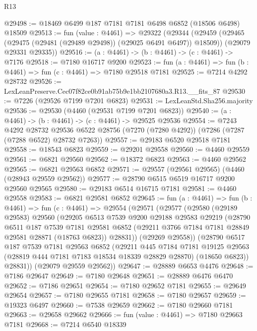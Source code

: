 \begin{lexlean}{R13}
\begin{coremodule}
@29498 := @18469 @6499 @187 @7181 @7181 @6498 @6852 (@18506 @6498) @18509
@29513 := fun (value : @4461) =>
  @29322
    (@29344
      (@29459 (@29465 (@29475 (@29481 (@29489 @29498)) (@29025 @6491 @6497)) @18509))
      (@29079 @29331 @29335))
@29516 := (a : @4461) -> (b : @4461) -> (c : @4461) -> @7176
@29518 := @7180 @16717 @9200
@29523 := fun (a : @4461) => fun (b : @4461) => fun (c : @4461) => @7180 @29518 @7181
@29525 := @7214 @4292 @28732
@29526 := LexLeanPreserve.Cec07f82ce0b91ab75b9e1bb2107680a3.R13.__fits_87
@29530 := @7226 (@29526 @7199 @7201 @6823)
@29531 := LexLeanStd.Sha256.majority
@29536 := @29530 (@4460 (@29531 @7199 @7201 @6823))
@29540 := (a : @4461) -> (b : @4461) -> (c : @4461) -> @29525 @29536
@29554 := @7243
    @4292
    @28732
    @29536
    @6522
    @28756
    (@7270 (@7280 @4292))
    (@7286 (@7287 (@7288 @6522) @28732 @7263))
@29557 := @29183 @6520 @29518 @7181
@29558 := @18543 @6823
@29559 := @29201 @29558
@29560 := @4460 @29559
@29561 := @6821 @29560
@29562 := @18372 @6823
@29563 := @4460 @29562
@29565 := @6821 @29563 @6852
@29571 := @29557 (@29561 @29565) (@4460 (@28943 @29559 @29562))
@29577 := @28790 @6515 @6519 @16717 @9200 @29560 @29565
@29580 := @29183 @6514 @16715 @7181
@29581 := @4460 @29558
@29583 := @6821 @29581 @6852
@29645 := fun (a : @4461) =>
  fun (b : @4461) =>
  fun (c : @4461) =>
  @29554
    (@29571
      (@29577
        (@29580
          (@29189 @29583)
          @29560
          (@29205
            @6513
            @7539
            @9200
            @29188
            @29583
            @29219
            (@28790
              @6511
              @187
              @7539
              @7181
              @29581
              @6852
              (@29211 @3766 @7184 @7181 @28849 @29581 @28871 (@18763 @6823))
              @28831))
          (@29269 @29558))
        (@28790
          @6517
          @187
          @7539
          @7181
          @29563
          @6852
          (@29211
            @445
            @7184
            @7181
            @19125
            @29563
            (@28819 @444 @7181 @7183 @18534 @18339 @28829 @28870)
            (@18650 @6823))
          @28831))
      (@29079 @29559 @29562))
@29647 := @28889 @6653 @4476
@29648 := @7186 @29647
@29649 := @7180 @29648
@29651 := @28889 @6476 @6470
@29652 := @7186 @29651
@29654 := @7180 @29652 @7181
@29655 := @29649 @29654
@29657 := @7180 @29655 @7181
@29658 := @7180 @29657
@29659 := @19323 @6497
@29660 := @7538 @29659
@29662 := @7180 @29660 @7181
@29663 := @29658 @29662
@29666 := fun (value : @4461) => @7180 @29663 @7181
@29668 := @7214 @6540 @18339

\end{coremodule}
\end{lexlean}
